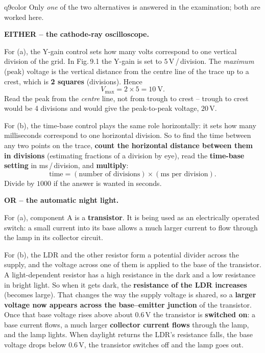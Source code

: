 \documentclass[11pt,a4paper]{article}
\begin{document}
\begin{ansbox}{q9color}
Only \emph{one} of the two alternatives is answered in the examination; both are worked here.

\medskip
\textbf{EITHER -- the cathode-ray oscilloscope.}

For (a), the Y-gain control sets how many volts correspond to one vertical division of the grid. In Fig.\,9.1 the Y-gain is set to $5$\,V\,/\,division. The \emph{maximum} (peak) voltage is the vertical distance from the centre line of the trace up to a crest, which is \textbf{2 squares} (divisions). Hence
\[ V_{\max} = 2 \times 5 = 10\ \mathrm{V}. \]
Read the peak from the \emph{centre} line, not from trough to crest -- trough to crest would be 4 divisions and would give the peak-to-peak voltage, $20$\,V.

For (b), the time-base control plays the same role horizontally: it sets how many milliseconds correspond to one horizontal division. So to find the time between any two points on the trace, \textbf{count the horizontal distance between them in divisions} (estimating fractions of a division by eye), read the \textbf{time-base setting} in ms\,/\,division, and \textbf{multiply}:
\[ \text{time} = (\text{number of divisions}) \times (\text{ms per division}). \]
Divide by $1000$ if the answer is wanted in seconds.

\medskip
\textbf{OR -- the automatic night light.}

For (a), component A is a \textbf{transistor}. It is being used as an electrically operated switch: a small current into its base allows a much larger current to flow through the lamp in its collector circuit.

For (b), the LDR and the other resistor form a potential divider across the supply, and the voltage across one of them is applied to the base of the transistor. A light-dependent resistor has a high resistance in the dark and a low resistance in bright light. So when it gets dark, the \textbf{resistance of the LDR increases} (becomes large). That changes the way the supply voltage is shared, so a \textbf{larger voltage now appears across the base--emitter junction} of the transistor. Once that base voltage rises above about $0.6$\,V the transistor is \textbf{switched on}: a base current flows, a much larger \textbf{collector current flows} through the lamp, and the lamp lights. When daylight returns the LDR's resistance falls, the base voltage drops below $0.6$\,V, the transistor switches off and the lamp goes out.
\end{ansbox}
\end{document}
